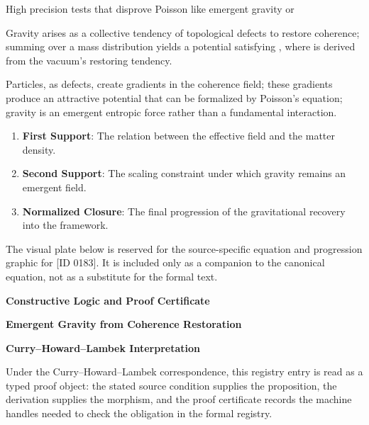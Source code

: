 High precision tests that disprove Poisson like emergent gravity or

Gravity arises as a collective tendency of topological defects to restore coherence; summing over a mass distribution yields a potential satisfying , where is derived from the vacuum's restoring tendency.  

Particles, as defects, create gradients in the coherence field; these gradients produce an attractive potential that can be formalized by Poisson's equation; gravity is an emergent entropic force rather than a fundamental interaction.  
\endgroup

\begin{enumerate}[leftmargin=1.6em,itemsep=6pt,topsep=4pt]
\item \textbf{First Support}: The relation between the effective field and the matter density.
\item \textbf{Second Support}: The scaling constraint under which gravity remains an emergent field.
\item \textbf{Normalized Closure}: The final progression of the gravitational recovery into the framework.
\end{enumerate}

\begingroup\footnotesize\sloppy
The visual plate below is reserved for the source-specific equation and progression graphic for [ID 0183]. It is included only as a companion to the canonical equation, not as a substitute for the formal text.
\par\endgroup
\ifTZPDarkEdition
{}
\fi

\clearpage
\begingroup\tzpsupportsetup
\noindent\textbf{\fontsize{10.8pt}{12.8pt}\selectfont [ID 0183] Constructive Logic and Proof Certificate}\par
\noindent\textbf{\fontsize{10pt}{12pt}\selectfont Emergent Gravity from Coherence Restoration}\par
\vspace{0.45em}
\begingroup
\footnotesize
\setlength{\parskip}{0.22em}
\setlength{\parindent}{0pt}
\noindent\textbf{Curry--Howard--Lambek Interpretation}\par
Under the Curry--Howard--Lambek correspondence, this registry entry is read as a typed proof
object: the stated source condition supplies the proposition, the derivation supplies the
morphism, and the proof certificate records the machine handles needed to check the obligation
in the formal registry.

